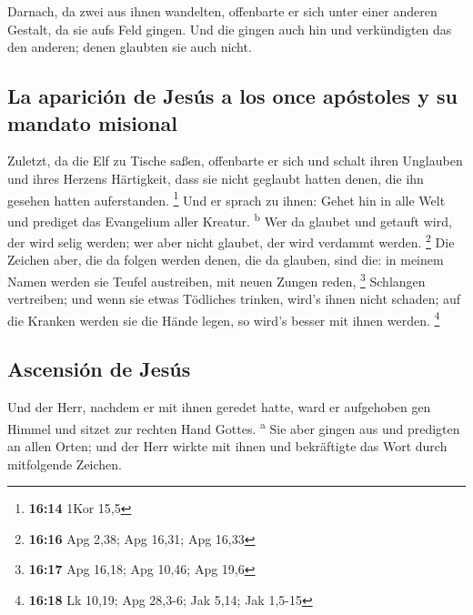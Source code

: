  Darnach, da zwei aus ihnen wandelten, offenbarte er sich
unter einer anderen Gestalt, da sie aufs Feld gingen. 
Und die gingen auch hin und verkündigten das den anderen; denen glaubten
sie auch nicht.

\hypertarget{la-apariciuxf3n-de-jesuxfas-a-los-once-apuxf3stoles-y-su-mandato-misional}{%
\subsection{La aparición de Jesús a los once apóstoles y su mandato
misional}\label{la-apariciuxf3n-de-jesuxfas-a-los-once-apuxf3stoles-y-su-mandato-misional}}

 Zuletzt, da die Elf zu Tische saßen, offenbarte er sich
und schalt ihren Unglauben und ihres Herzens Härtigkeit, dass sie nicht
geglaubt hatten denen, die ihn gesehen hatten auferstanden. \footnote{\textbf{16:14}
  1Kor 15,5}  Und er sprach zu ihnen: Gehet hin in alle
Welt und prediget das Evangelium aller Kreatur. \textsuperscript{b}
 Wer da glaubet und getauft wird, der wird selig werden;
wer aber nicht glaubet, der wird verdammt werden. \footnote{\textbf{16:16}
  Apg 2,38; Apg 16,31; Apg 16,33}  Die Zeichen aber, die
da folgen werden denen, die da glauben, sind die: in meinem Namen werden
sie Teufel austreiben, mit neuen Zungen reden, \footnote{\textbf{16:17}
  Apg 16,18; Apg 10,46; Apg 19,6}  Schlangen vertreiben;
und wenn sie etwas Tödliches trinken, wird's ihnen nicht schaden; auf
die Kranken werden sie die Hände legen, so wird's besser mit ihnen
werden. \footnote{\textbf{16:18} Lk 10,19; Apg 28,3-6; Jak 5,14; Jak
  1,5-15}

\hypertarget{ascensiuxf3n-de-jesuxfas}{%
\subsection{Ascensión de Jesús}\label{ascensiuxf3n-de-jesuxfas}}

 Und der Herr, nachdem er mit ihnen geredet hatte, ward
er aufgehoben gen Himmel und sitzet zur rechten Hand Gottes.
\textsuperscript{a}  Sie aber gingen aus und predigten an
allen Orten; und der Herr wirkte mit ihnen und bekräftigte das Wort
durch mitfolgende Zeichen.
